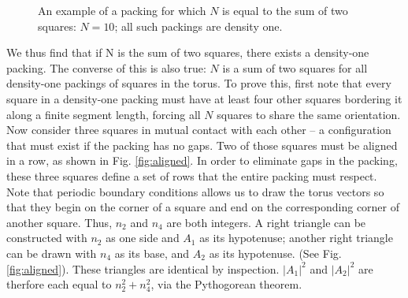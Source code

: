 \documentclass[aps]{revtex4}
\begin{document}
\begin{figure}[H]
\caption{\label{fig:bravais} An example of a packing for which $N$ is equal to the sum of two squares: $N=10$; all such packings are density one.}
\end{figure}


We thus find that if N is the sum of two squares, there exists a density-one packing. The converse of this is also true: $N$ is a sum of two squares for all density-one packings of squares in the torus. To prove this, first note that every square in a density-one packing must have at least four other squares bordering it along a finite segment length, forcing all $N$ squares to share the same orientation.  Now consider three squares in mutual contact with each other -- a configuration that must exist if the packing has no gaps. Two of those squares must be aligned in a row, as shown in Fig. \ref{fig:aligned}. In order to eliminate gaps in the packing, these three squares define a set of rows that the entire packing must respect. Note that periodic boundary conditions allows us to draw the torus vectors so that they begin on the corner of a square and end on the corresponding corner of another square.  Thus, $n_2$ and $n_4$ are both integers. A right triangle can be constructed with $n_2$ as one side and $A_1$ as its hypotenuse; another right triangle can be drawn with $n_4$ as its base, and $A_2$ as its hypotenuse. (See Fig. \ref{fig:aligned}). These triangles are identical by inspection.  $|A_1|^2$ and $|A_2|^2$ are therfore each equal to $n_2^2 + n_4^2$, via the Pythogorean theorem.
\end{document}
